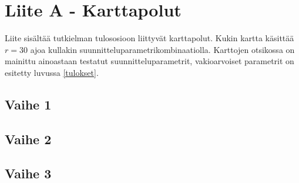 \documentclass[
  12pt,
  a4paper, twoside]{book}
\begin{document}
\hypertarget{liite-a---karttapolut}{%
\chapter*{Liite A - Karttapolut}\label{liite-a---karttapolut}}

Liite sisältää tutkielman tulososioon liittyvät karttapolut. Kukin kartta käsittää \(r=30\) ajoa kullakin suunnitteluparametrikombinaatiolla. Karttojen otsikossa on mainittu ainoastaan testatut suunnitteluparametrit, vakioarvoiset parametrit on esitetty luvussa \ref{tulokset}.

\section{Vaihe 1} \label{liite-a-vaihe-1}

\section{Vaihe 2} \label{liite-a-vaihe-2}

\section{Vaihe 3} \label{liite-a-vaihe-3}

  
\end{document}
